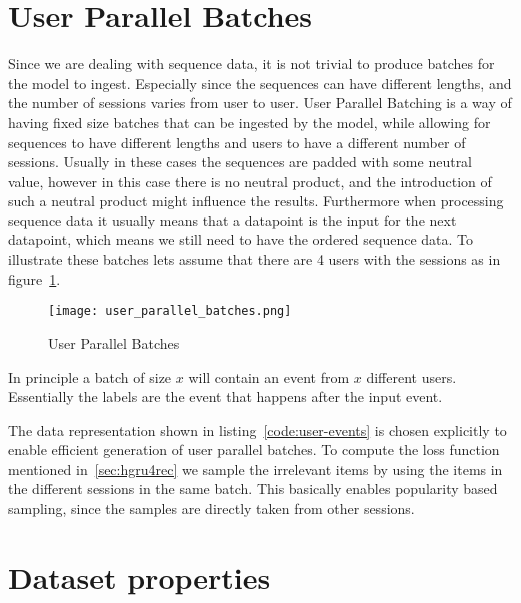 \section{User Parallel Batches}
Since we are dealing with sequence data, it is not trivial to produce batches for the model to ingest.
Especially since the sequences can have different lengths, and the number of sessions varies from user to user.
User Parallel Batching is a way of having fixed size batches that can be ingested by the model, while allowing for sequences to have different lengths and users to have a different number of sessions.
Usually in these cases the sequences are padded with some neutral value, however in this case there is no neutral product, and the introduction of such a neutral product might influence the results.
Furthermore when processing sequence data it usually means that a datapoint is the input for the next datapoint, which means we still need to have the ordered sequence data.
To illustrate these batches lets assume that there are 4 users with the sessions as in figure~\ref{fig:user_parallel_batches}.

\begin{figure}[ht]
	\centering
	\captionsetup{width=0.8\textwidth}
    \texttt{[image: user\_parallel\_batches.png]}
    \caption{User Parallel Batches}
    \label{fig:user_parallel_batches}
\end{figure}

In principle a batch of size $x$ will contain an event from $x$ different users.
Essentially the labels are the event that happens after the input event.
\par
The data representation shown in listing~\ref{code:user-events} is chosen explicitly to enable efficient generation of user parallel batches.
To compute the loss function mentioned in~\ref{sec:hgru4rec} we sample the irrelevant items by using the items in the different sessions in the same batch.
This basically enables popularity based sampling, since the samples are directly taken from other sessions.

\section{Dataset properties}\label{sec:dataset_properties}
